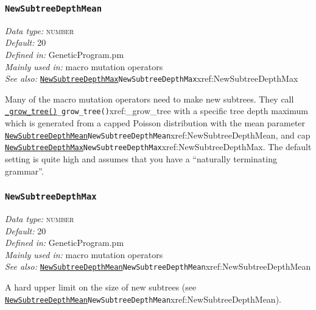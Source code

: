 \documentclass[a4paper]{article}
\begin{document}
\subsubsection{\texttt{NewSubtreeDepthMean}}\label{xref:NewSubtreeDepthMean}
\begin{flushleft}
\textit{Data type:} \textsc{number}\\
\textit{Default:} 20\\
\textit{Defined in:} GeneticProgram.pm\\
\textit{Mainly used in:} macro mutation operators\\
\textit{See also:} \hyperref[no]{\texttt{NewSubtreeDepthMax}}{\texttt{NewSubtreeDepthMax}}{xref:NewSubtreeDepthMax}
\end{flushleft}

Many of the macro mutation operators need to make new subtrees.  They
call \hyperref[no]{\texttt{\_grow\_tree()}}{\texttt{\_grow\_tree()}}{xref:_grow_tree} with a specific tree depth maximum which
is generated from a capped Poisson distribution with the mean
parameter \hyperref[no]{\texttt{NewSubtreeDepthMean}}{\texttt{NewSubtreeDepthMean}}{xref:NewSubtreeDepthMean}, and cap
\hyperref[no]{\texttt{NewSubtreeDepthMax}}{\texttt{NewSubtreeDepthMax}}{xref:NewSubtreeDepthMax}.  The default setting is quite high and
assumes that you have a ``naturally terminating grammar''.

\subsubsection{\texttt{NewSubtreeDepthMax}}\label{xref:NewSubtreeDepthMax}
\begin{flushleft}
\textit{Data type:} \textsc{number}\\
\textit{Default:} 20\\
\textit{Defined in:} GeneticProgram.pm\\
\textit{Mainly used in:} macro mutation operators\\
\textit{See also:} \hyperref[no]{\texttt{NewSubtreeDepthMean}}{\texttt{NewSubtreeDepthMean}}{xref:NewSubtreeDepthMean}
\end{flushleft}

A hard upper limit on the size of new subtrees (see
\hyperref[no]{\texttt{NewSubtreeDepthMean}}{\texttt{NewSubtreeDepthMean}}{xref:NewSubtreeDepthMean}).
\end{document}
